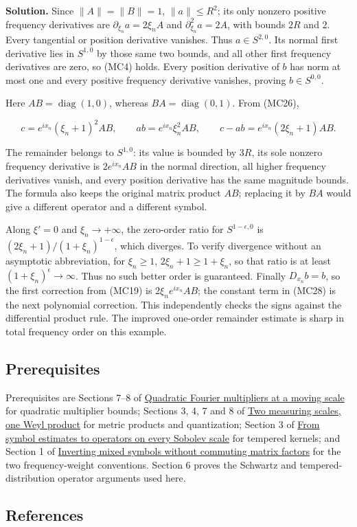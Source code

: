 \documentclass[
  11pt,
]{article}
\begin{document}
\textbf{Solution.} Since \(\|A\|=\|B\|=1\), \(\|a\|\leq R^2\); its only
nonzero positive frequency derivatives are \(\partial_{\xi_n}a=2\xi_nA\)
and \(\partial_{\xi_n}^2a=2A\), with bounds \(2R\) and \(2\). Every
tangential or position derivative vanishes. Thus \(a\in S^{2,0}\). Its
normal first derivative lies in \(S^{1,0}\) by those same two bounds,
and all other first frequency derivatives are zero, so (MC4) holds.
Every position derivative of \(b\) has norm at most one and every
positive frequency derivative vanishes, proving \(b\in S^{0,0}\).

Here \(AB=\operatorname{diag}(1,0)\), whereas
\(BA=\operatorname{diag}(0,1)\). From (MC26),

\[
c=e^{ix_n}(\xi_n+1)^2AB,\qquad
ab=e^{ix_n}\xi_n^2AB,\qquad
c-ab=e^{ix_n}(2\xi_n+1)AB.
\tag{MC28}
\]

The remainder belongs to \(S^{1,0}\): its value is bounded by \(3R\),
its sole nonzero frequency derivative is \(2e^{ix_n}AB\) in the normal
direction, all higher frequency derivatives vanish, and every position
derivative has the same magnitude bounds. The formula also keeps the
original matrix product \(AB\); replacing it by \(BA\) would give a
different operator and a different symbol.

Along \(\xi'=0\) and \(\xi_n\to+\infty\), the zero-order ratio for
\(S^{1-\epsilon,0}\) is \((2\xi_n+1)/(1+\xi_n)^{1-\epsilon}\), which
diverges. To verify divergence without an asymptotic abbreviation, for
\(\xi_n\geq1\), \(2\xi_n+1\geq1+\xi_n\), so that ratio is at least
\((1+\xi_n)^\epsilon\to\infty\). Thus no such better order is
guaranteed. Finally \(D_{x_n}b=b\), so the first correction from (MC19)
is \(2\xi_ne^{ix_n}AB\); the constant term in (MC28) is the next
polynomial correction. This independently checks the signs against the
differential product rule. The improved one-order remainder estimate is
sharp in total frequency order on this example.

\subsection{Prerequisites}\label{prerequisites}

Prerequisites are Sections 7--8 of
\href{gauss-transform-estimates.pdf}{Quadratic Fourier multipliers at a
moving scale} for quadratic multiplier bounds; Sections 3, 4, 7 and 8 of
\href{weyl-metric-products.pdf}{Two measuring scales, one Weyl product}
for metric products and quantization; Section 3 of
\href{euclidean-symbol-calculus.pdf}{From symbol estimates to operators
on every Sobolev scale} for tempered kernels; and Section 1 of
\href{mixed-symbol-inversion.pdf}{Inverting mixed symbols without
commuting matrix factors} for the two frequency-weight conventions.
Section 6 proves the Schwartz and tempered-distribution operator
arguments used here.

\subsection{References}\label{references}
\end{document}
